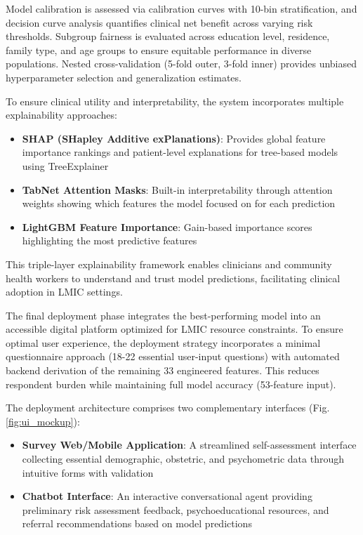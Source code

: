 Model calibration is assessed via calibration curves with 10-bin stratification, and decision curve analysis quantifies clinical net benefit across varying risk thresholds. Subgroup fairness is evaluated across education level, residence, family type, and age groups to ensure equitable performance in diverse populations. Nested cross-validation (5-fold outer, 3-fold inner) provides unbiased hyperparameter selection and generalization estimates.

To ensure clinical utility and interpretability, the system incorporates multiple explainability approaches:
\begin{itemize}
    \item \textbf{SHAP (SHapley Additive exPlanations)}: Provides global feature importance rankings and patient-level explanations for tree-based models using TreeExplainer
    \item \textbf{TabNet Attention Masks}: Built-in interpretability through attention weights showing which features the model focused on for each prediction
    \item \textbf{LightGBM Feature Importance}: Gain-based importance scores highlighting the most predictive features
\end{itemize}

This triple-layer explainability framework enables clinicians and community health workers to understand and trust model predictions, facilitating clinical adoption in LMIC settings.

The final deployment phase integrates the best-performing model into an accessible digital platform optimized for LMIC resource constraints. To ensure optimal user experience, the deployment strategy incorporates a minimal questionnaire approach (18-22 essential user-input questions) with automated backend derivation of the remaining 33 engineered features. This reduces respondent burden while maintaining full model accuracy (53-feature input).

The deployment architecture comprises two complementary interfaces (Fig. \ref{fig:ui_mockup}):
\begin{itemize}
    \item \textbf{Survey Web/Mobile Application}: A streamlined self-assessment interface collecting essential demographic, obstetric, and psychometric data through intuitive forms with validation
    \item \textbf{Chatbot Interface}: An interactive conversational agent providing preliminary risk assessment feedback, psychoeducational resources, and referral recommendations based on model predictions
\end{itemize}

